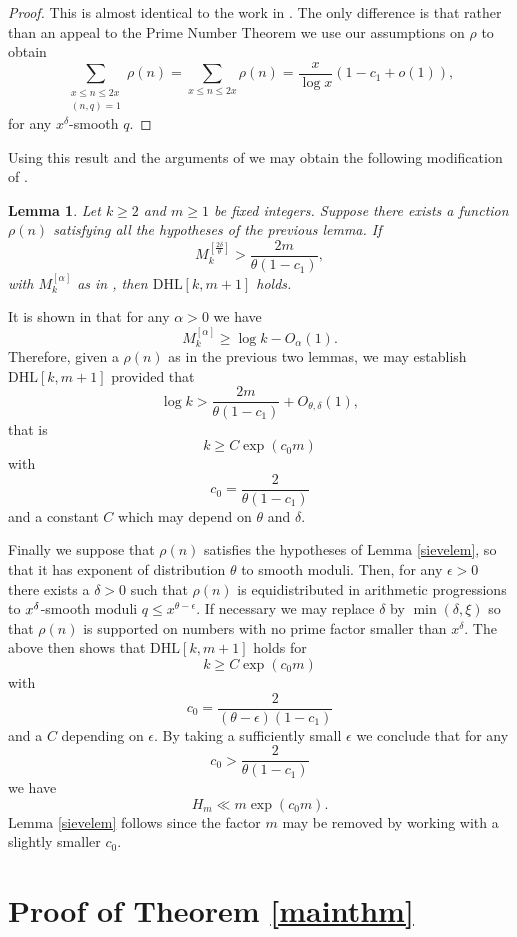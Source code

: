 \documentclass[12pt]{amsart}
\theoremstyle{plain}
\newtheorem{lem}{Lemma}
\theoremstyle{definition}
\numberwithin{equation}{section}
\newcommand{\twosum}[2]{\sum_{\substack{#1\\#2}}}
\begin{document}
\begin{proof}
This is almost identical to the work in \cite[Sections 4.3 and 4.4]{polymath8b}.  The only difference is that rather than an appeal to the Prime Number Theorem we use our assumptions on $\rho$ to obtain 
$$\twosum{x\leq n\leq 2x}{(n,q)=1}\rho(n)=\sum_{x\leq n\leq 2x}\rho(n)=\frac{x}{\log x}(1-c_1+o(1)),$$
for any $x^\delta$-smooth $q$.  
\end{proof}

Using this result and the arguments of \cite[Section 5.2]{polymath8b} we may obtain the following modification of \cite[3.10]{polymath8b}.

\begin{lem}
Let $k\geq 2$ and $m\geq 1$ be fixed integers.  Suppose there exists a function $\rho(n)$ satisfying all the hypotheses of the previous lemma.  If 
$$M_k^{[\frac{2\delta}{\theta}]} > \frac{2m}{\theta(1-c_1)},$$
with $M_k^{[\alpha]}$ as in \cite[Theorem 3.10]{polymath8b}, then $\mathrm{DHL}[k,m+1]$ holds.
\end{lem}

It is shown in \cite[Section 6]{polymath8b} that for any $\alpha>0$ we have 
$$M_k^{[\alpha]}\geq \log k-O_\alpha(1).$$
Therefore, given a $\rho(n)$ as in the previous two lemmas, we may establish $\mathrm{DHL}[k,m+1]$ provided that 
$$\log k > \frac{2m}{\theta(1-c_1)}+O_{\theta,\delta}(1),$$
that is 
$$k\geq C\exp(c_0m)$$
with 
$$c_0=\frac{2}{\theta(1-c_1)}$$
and a constant $C$ which may depend on $\theta$ and $\delta$.  

Finally we suppose that $\rho(n)$ satisfies the hypotheses of Lemma \ref{sievelem}, so that it has exponent of distribution $\theta$ to smooth moduli.  Then, for any $\epsilon>0$ there exists a $\delta>0$  such that $\rho(n)$ is equidistributed in arithmetic progressions to $x^\delta$-smooth moduli $q\leq x^{\theta-\epsilon}$.  If necessary we may replace $\delta$ by $\min(\delta,\xi)$ so that $\rho(n)$ is supported on numbers with no prime factor smaller than $x^\delta$.  The above then shows that $\mathrm{DHL}[k,m+1]$ holds for 
$$k\geq C\exp(c_0m)$$
with 
$$c_0=\frac{2}{(\theta-\epsilon)(1-c_1)}$$
and a $C$ depending on $\epsilon$.  By taking a sufficiently small $\epsilon$ we conclude that for any
$$c_0>\frac{2}{\theta(1-c_1)}$$
we have 
$$H_m\ll m\exp(c_0m).$$
Lemma \ref{sievelem} follows since the factor $m$ may be removed by working with a slightly smaller $c_0$.  




\section{Proof of Theorem \ref{mainthm}}
\end{document}
